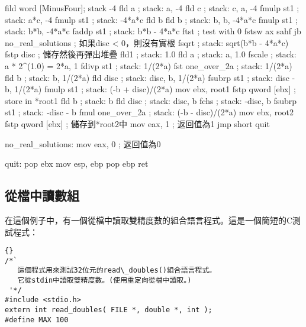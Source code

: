 {\begin{AsmCodeListing}[label=quad.asm,commentchar=$]
        fild    word [MinusFour]; stack -4
        fld     a               ; stack: a, -4
        fld     c               ; stack: c, a, -4
        fmulp   st1             ; stack: a*c, -4
        fmulp   st1             ; stack: -4*a*c
        fld     b
        fld     b               ; stack: b, b, -4*a*c
        fmulp   st1             ; stack: b*b, -4*a*c
        faddp   st1             ; stack: b*b - 4*a*c
        ftst                    ; test with 0
        fstsw   ax
        sahf
        jb      no_real_solutions ; 如果disc < 0，則沒有實根
        fsqrt                   ; stack: sqrt(b*b - 4*a*c)
        fstp    disc            ; 儲存然後再彈出堆疊
        fld1                    ; stack: 1.0
        fld     a               ; stack: a, 1.0
        fscale                  ; stack: a * 2^(1.0) = 2*a, 1
        fdivp   st1             ; stack: 1/(2*a)
        fst     one_over_2a     ; stack: 1/(2*a)
        fld     b               ; stack: b, 1/(2*a)
        fld     disc            ; stack: disc, b, 1/(2*a)
        fsubrp  st1             ; stack: disc - b, 1/(2*a)
        fmulp   st1             ; stack: (-b + disc)/(2*a)
        mov     ebx, root1
        fstp    qword [ebx]     ; store in *root1
        fld     b               ; stack: b
        fld     disc            ; stack: disc, b
        fchs                    ; stack: -disc, b
        fsubrp  st1             ; stack: -disc - b
        fmul    one_over_2a     ; stack: (-b - disc)/(2*a)
        mov     ebx, root2
        fstp    qword [ebx]     ; 儲存到*root2中
        mov     eax, 1          ; 返回值為1
        jmp     short quit

no_real_solutions:
        mov     eax, 0          ; 返回值為0

quit:
        pop     ebx
        mov     esp, ebp
        pop     ebp
        ret
\end{AsmCodeListing}

\subsection{從檔中讀數組}

在這個例子中，有一個從檔中讀取雙精度數的組合語言程式。這是一個簡短的C測試程式：
\lstset{escapeinside=`',language=Pascal,%
}
\begin{lstlisting}{}
/*`
   這個程式用來測試32位元的read\_doubles()組合語言程式。
   它從stdin中讀取雙精度數。(使用重定向從檔中讀取。)
 '*/
#include <stdio.h>
extern int read_doubles( FILE *, double *, int );
#define MAX 100


\end{lstlisting}}
